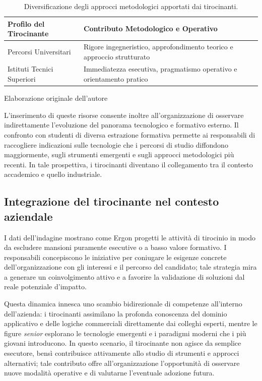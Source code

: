 \begin{table}[H]
    \centering
    \begin{tabular}{p{} p{}}
        \hline
        \textbf{Profilo del Tirocinante} & \textbf{Contributo Metodologico e Operativo} \\
        \hline
        Percorsi Universitari & Rigore ingegneristico, approfondimento teorico e approccio strutturato \\
        Istituti Tecnici Superiori & Immediatezza esecutiva, pragmatismo operativo e orientamento pratico \\
        \hline
    \end{tabular}
    \caption{Diversificazione degli approcci metodologici apportati dai tirocinanti.}
    \vspace{0.1cm}
    {\footnotesize Elaborazione originale dell'autore\par}
    \label{tab:confronto_profili_tirocinio}
\end{table}

L'inserimento di queste risorse consente inoltre all'organizzazione di osservare indirettamente l'evoluzione del panorama tecnologico e formativo esterno. Il confronto con studenti di diversa estrazione formativa permette ai responsabili di raccogliere indicazioni sulle tecnologie che i percorsi di studio diffondono maggiormente, sugli strumenti emergenti e sugli approcci metodologici più recenti. In tale prospettiva, i tirocinanti diventano il collegamento tra il contesto accademico e quello industriale.

\subsection{Integrazione del tirocinante nel contesto aziendale}
\label{subsec:integrazione_tirocinante}

I dati dell'indagine mostrano come Ergon progetti le attività di tirocinio in modo da escludere mansioni puramente esecutive o a basso valore formativo. I responsabili concepiscono le iniziative per coniugare le esigenze concrete dell'organizzazione con gli interessi e il percorso del candidato; tale strategia mira a generare un coinvolgimento attivo e a favorire la validazione di soluzioni dal reale potenziale d'impatto.

Questa dinamica innesca uno scambio bidirezionale di competenze all'interno dell'azienda: i tirocinanti assimilano la profonda conoscenza del dominio applicativo e delle logiche commerciali direttamente dai colleghi esperti, mentre le figure \textit{senior} esplorano le tecnologie emergenti e i paradigmi moderni che i più giovani introducono. In questo scenario, il tirocinante non agisce da semplice esecutore, bensì contribuisce attivamente allo studio di strumenti e approcci alternativi; tale contributo offre all'organizzazione l'opportunità di osservare nuove modalità operative e di valutarne l'eventuale adozione futura.

